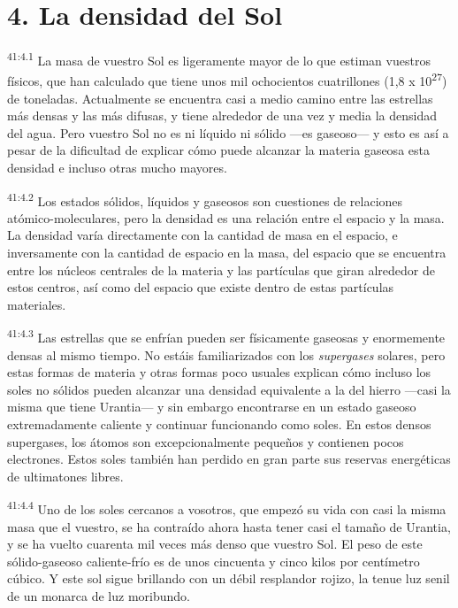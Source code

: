 \section*{4. La densidad del Sol}
\par
\textsuperscript{41:4.1} La masa de vuestro Sol es ligeramente mayor de lo que estiman vuestros físicos, que han calculado que tiene unos mil ochocientos cuatrillones (1,8 x 10\textsuperscript{27}) de toneladas. Actualmente se encuentra casi a medio camino entre las estrellas más densas y las más difusas, y tiene alrededor de una vez y media la densidad del agua. Pero vuestro Sol no es ni líquido ni sólido ---es gaseoso--- y esto es así a pesar de la dificultad de explicar cómo puede alcanzar la materia gaseosa esta densidad e incluso otras mucho mayores.

\par
\textsuperscript{41:4.2} Los estados sólidos, líquidos y gaseosos son cuestiones de relaciones atómico-moleculares, pero la densidad es una relación entre el espacio y la masa. La densidad varía directamente con la cantidad de masa en el espacio, e inversamente con la cantidad de espacio en la masa, del espacio que se encuentra entre los núcleos centrales de la materia y las partículas que giran alrededor de estos centros, así como del espacio que existe dentro de estas partículas materiales.

\par
\textsuperscript{41:4.3} Las estrellas que se enfrían pueden ser físicamente gaseosas y enormemente densas al mismo tiempo. No estáis familiarizados con los \textit{supergases} solares, pero estas formas de materia y otras formas poco usuales explican cómo incluso los soles no sólidos pueden alcanzar una densidad equivalente a la del hierro ---casi la misma que tiene Urantia--- y sin embargo encontrarse en un estado gaseoso extremadamente caliente y continuar funcionando como soles. En estos densos supergases, los átomos son excepcionalmente pequeños y contienen pocos electrones. Estos soles también han perdido en gran parte sus reservas energéticas de ultimatones libres.

\par
\textsuperscript{41:4.4} Uno de los soles cercanos a vosotros, que empezó su vida con casi la misma masa que el vuestro, se ha contraído ahora hasta tener casi el tamaño de Urantia, y se ha vuelto cuarenta mil veces más denso que vuestro Sol. El peso de este sólido-gaseoso caliente-frío es de unos cincuenta y cinco kilos por centímetro cúbico. Y este sol sigue brillando con un débil resplandor rojizo, la tenue luz senil de un monarca de luz moribundo.

